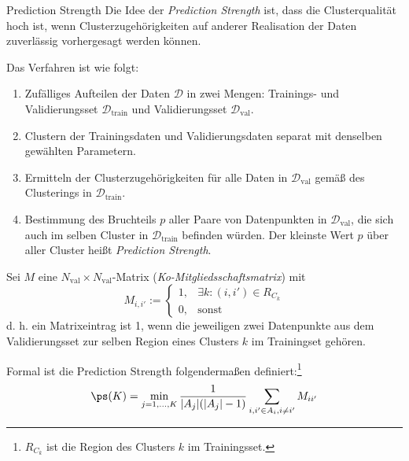\begin{defi}{Prediction Strength}
    Die Idee der \emph{Prediction Strength} ist, dass die  Clusterqualität hoch ist, wenn Clusterzugehörigkeiten auf anderer Realisation der Daten zuverlässig vorhergesagt werden können.

    Das Verfahren ist wie folgt:
    \begin{enumerate}
        \item Zufälliges Aufteilen der Daten $\mathcal{D}$ in zwei Mengen: Trainings- und Validierungsset $\mathcal{D}_\text{train}$ und Validierungsset $\mathcal{D}_\text{val}$.
        \item Clustern der Trainingsdaten und Validierungsdaten separat mit denselben gewählten Parametern.
        \item Ermitteln der Clusterzugehörigkeiten für alle Daten in $\mathcal{D}_\text{val}$ gemäß des Clusterings in $\mathcal{D}_\text{train}$.
        \item Bestimmung des Bruchteils $p$ aller Paare von Datenpunkten in $\mathcal{D}_\text{val}$, die sich auch im selben Cluster in $\mathcal{D}_\text{train}$ befinden würden.
              Der kleinste Wert $p$ über aller Cluster heißt \emph{Prediction Strength}.
    \end{enumerate}

    Sei $M$ eine $N_{\text{val}} \times N_{\text{val}}$-Matrix (\emph{Ko-Mitgliedsschaftsmatrix}) mit
    \[
        M_{i, i'} :=
        \begin{cases}
            1, & \exists k: (i, i') \in R_{C_k} \\
            0, & \text{sonst}
        \end{cases}
    \]
    d. h. ein Matrixeintrag ist 1, wenn die jeweiligen zwei Datenpunkte aus dem Validierungsset zur selben Region eines Clusters $k$ im Trainingset gehören.

    Formal ist die Prediction Strength folgendermaßen definiert:\footnote{$R_{C_k}$ ist die Region des Clusters $k$ im Trainingsset.}
    \[
        \ps(K) = \min_{j = 1, \ldots, K} \frac{1}{|A_j| (|A_j| - 1)} \sum_{i, i' \in A_i, i \neq i'} M_{ii'}
    \]
\end{defi}